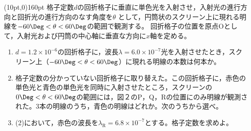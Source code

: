 \hakosyokika
\item
    \begin{mawarikomi}(10pt,0){160pt}{}
    格子定数$d$の回折格子に垂直に単色光を入射させ，入射光の進行方向と回折光の進行方向のなす角度を$\theta $
    として，円筒状のスクリーン上に現れる明線を$-60\Deg <\theta <60\Deg $の範囲で観測する。
    回折格子の位置を原点Oとして，入射光および円筒の中心軸に垂直な方向に$x$軸を定める。
        \begin{enumerate}
            \item $d=1.2\times 10^{-6}$の回折格子に，波長$\lambda =6.0\times 10^{-7}$光を入射させたとき，スクリーン上（$-60\Deg <\theta <60\Deg $）に現れる明線の本数は何本か。
            \item 格子定数の分かっていない回折格子に取り替えた。この回折格子に，赤色の単色光と青色の単色光を同時に入射させたところ，スクリーンの$0\Deg < \theta <60\Deg $の範囲には，図２のP，Q，Rの位置にのみ明線が観測された。3本の明線のうち，青色の明線はどれか。次のうちから選べ。
            \item (2)において，赤色の波長を$\lambda_\mathrm{R}=6.8\times 10^{-7}$とする。格子定数を求めよ。
        \end{enumerate}
    \end{mawarikomi}